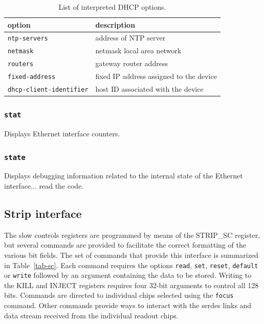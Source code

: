 \documentclass[11pt]{article}
\begin{document}
\begin{table}
\begin{center}
\begin{tabular}{|l|l|} \hline
option & description \\ \hline
{\tt ntp-servers} & address of NTP server \\
{\tt netmask} & netmask local area network \\
{\tt routers} & gateway router address \\
{\tt fixed-address} & fixed IP address assigned to the device \\
{\tt dhcp-client-identifier} & host ID associated with the device \\  \hline
\end{tabular}
\end{center}
\caption{\label{tab-dhcpopt}List of interpreted DHCP options.}
\end{table}

\subsubsection{\tt stat}
Displays Ethernet interface counters.

\subsubsection{\tt state}
Displays debugging information related to the internal state of the Ethernet
interface... read the code.

\subsection{Strip interface}
The slow controls registers are programmed by means of the STRIP\_SC register,
but several commands are provided to facilitate the correct formatting of the
various bit fields.  The set of commands that provide this interface is
summarized in Table~\ref{tab-sc}.  Each command requires the options
{\tt read}, {\tt set}, {\tt reset}, {\tt default} or {\tt write} followed
by an argument containing the data to be stored.  Writing to the KILL and
INJECT registers requires four 32-bit arguments to control all 128 bits.
Commands are directed to individual chips selected using the {\tt focus}
command.  Other commands provide ways to interact with the serdes links
and data stream received from the individual readout chips.
\end{document}
